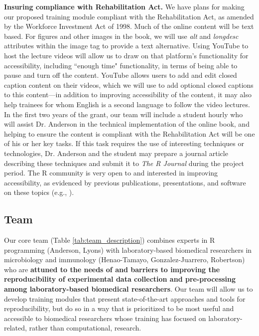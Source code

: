 \documentclass[pdftex,english,11pt,parskip=half]{scrartcl}
\begin{document}
\noindent \textbf{Insuring compliance with Rehabilitation Act.} We have plans
for making our proposed training module compliant with the
Rehabilitation Act, as amended by the Workforce Investment
Act of 1998. Much of the online content will be text based. For figures and
other images in the book, we will use \textit{alt} and \textit{longdesc} attributes
within the image tag to provide a text alternative. Using YouTube to host the
lecture videos will allow us to draw on that platform's functionality for accessibility,
including ``enough time" functionality, in terms of being able to pause and turn
off the content. YouTube allows users to add and edit closed caption content on
their videos, which we will use to add optional closed captions to this
content---in addition to improving accessibility of the content, it may also
help trainees for whom English is a second language to follow the video lectures. In
the first two years of the grant, our team will include a student hourly who will assist
Dr. Anderson in the technical implementation of the online book, and helping to
ensure the content is compliant with the Rehabilitation Act will be one of his or her
key tasks. If this task requires the use of interesting techniques or
technologies, Dr. Anderson and the student may prepare a journal article
describing these techniques and submit it to \textit{The R Journal} during the
project period. The R community is very open to and interested in improving
accessibility, as evidenced by previous publications, presentations, and
software on these topics (e.g., \cite{uswebr, godfrey2013statistical}).

\subsection{Team}



Our core team (Table \ref{tab:team_description}) combines experts in R programming (Anderson, Lyons) with
laboratory-based biomedical researchers in microbiology and immunology
(Henao-Tamayo, Gonzalez-Juarrero, Robertson) who are \textbf{attuned to the
needs of and barriers to improving the reproducibility of experimental data
collection and pre-processing among laboratory-based biomedical researchers}.
Our team will allow us to develop training modules that present state-of-the-art
approaches and tools for reproducibility, but do so in a way that is prioritized
to be most useful and accessible to biomedical researchers whose training has
focused on laboratory-related, rather than computational, research. 
\end{document}
